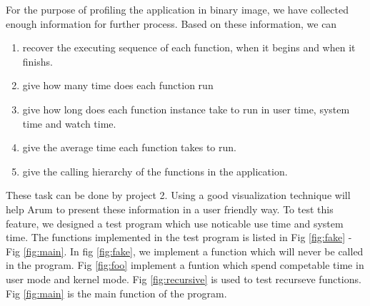 \documentclass[11pt,letterpaper,oneside]{article}
\begin{document}
For the purpose of profiling the application in binary image, we have collected enough information for further process. Based on these information, we can
\begin{enumerate}
\item recover the executing sequence of each function, when it begins and when it finishs.
\item give how many time does each function run
\item give how long does each function instance take to run in user time, system time and watch time.
\item give the average time each function takes to run.
\item give the calling hierarchy of the functions in the application.
\end{enumerate}
These task can be done by project 2. Using a good visualization technique will help Arum to present these information in a user friendly way.
\newline
To test this feature, we designed a test program which use noticable use time and system time. The functions implemented in the test program is listed in Fig \ref{fig:fake} - Fig \ref{fig:main}. In fig \ref{fig:fake}, we implement a function which will never be called in the program. Fig \ref{fig:foo} implement a funtion which spend competable time in user mode and kernel mode. Fig \ref{fig:recursive} is used to test recurseve functions. Fig \ref{fig:main} is the main function of the program.
\end{document}

